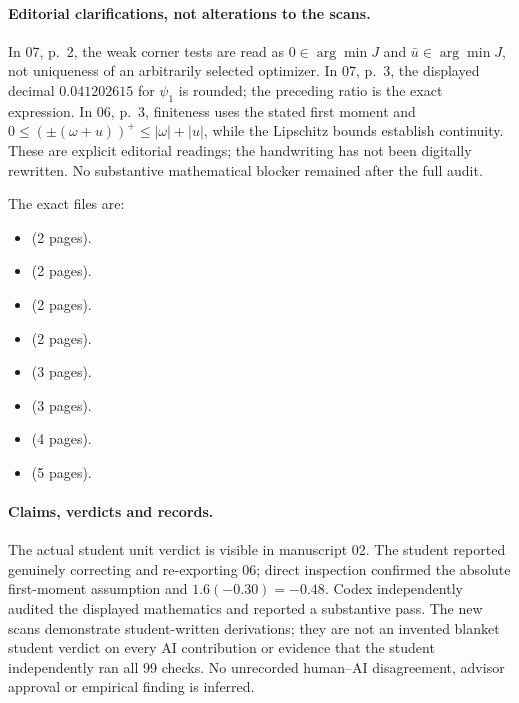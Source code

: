 \documentclass[11pt]{article}
\theoremstyle{definition}
\begin{document}
\paragraph{Editorial clarifications, not alterations to the scans.}
In 07, p.~2, the weak corner tests are read as $0\in\arg\min J$ and $\bar u\in\arg\min J$, not uniqueness of an arbitrarily selected optimizer. In 07, p.~3, the displayed decimal $0.041202615$ for $\psi_1$ is rounded; the preceding ratio is the exact expression. In 06, p.~3, finiteness uses the stated first moment and $0\le(\pm(\omega+u))^+\le|\omega|+|u|$, while the Lipschitz bounds establish continuity. These are explicit editorial readings; the handwriting has not been digitally rewritten. No substantive mathematical blocker remained after the full audit.

The exact files are:
\begin{itemize}
\setlength{\itemsep}{0pt}
\setlength{\parsep}{0pt}
\item {} (2 pages).
\item {} (2 pages).
\item {} (2 pages).
\item {} (2 pages).
\item {} (3 pages).
\item {} (3 pages).
\item {} (4 pages).
\item {} (5 pages).
\end{itemize}

\paragraph{Claims, verdicts and records.}
The actual student unit verdict is visible in manuscript 02. The student reported genuinely correcting and re-exporting 06; direct inspection confirmed the absolute first-moment assumption and $1.6(-0.30)=-0.48$. Codex independently audited the displayed mathematics and reported a substantive pass. The new scans demonstrate student-written derivations; they are not an invented blanket student verdict on every AI contribution or evidence that the student independently ran all 99 checks. No unrecorded human--AI disagreement, advisor approval or empirical finding is inferred.
\end{document}
